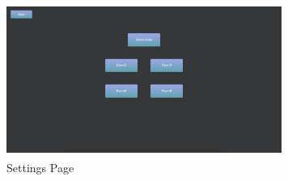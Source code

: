 \begin{figure}[!h]
\begin{center}
\includegraphics[width=9cm, height=5cm]{figures/settings}
\end{center}
\caption{Settings Page}
\label{fig:settings}
\end{figure}
